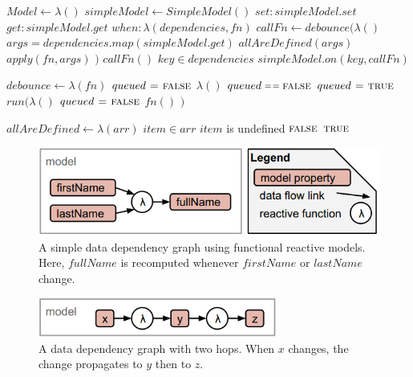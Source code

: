 \begin{codebox}
\li $Model \gets \lambda()$
\Do
  \li $simpleModel \gets SimpleModel()$
  \li \Return
  \Do
    \li $set: simpleModel.set$
    \li $get: simpleModel.get$
    \li $when: \lambda(dependencies, fn)$
    \Do
      \li $callFn \gets debounce(\lambda()$
      \Do
        \li $args = dependencies.map(simpleModel.get)$
        \li \If $allAreDefined(args)$
        \Do
          \li $apply(fn, args)$
        \End
      \End
      \li $)$
      \li $callFn()$
      \li \For $key \in dependencies$
      \Do
        \li $simpleModel.on(key, callFn)$
      \End  
    \End
  \End
\End
\end{codebox}
\begin{codebox}
\li $debounce \gets \lambda(fn)$
\Do
  \li $queued \mathrel{\hspace{1pt}=\hspace{1pt}} \textnormal{\scshape false}$
  \li \Return $\lambda()$
  \Do
    \li \If $queued \isequal \const{false}$
    \Do
      \li $queued \mathrel{\hspace{1pt}=\hspace{1pt}} \textnormal{\scshape true}$
      \li $run(\lambda()$
      \Do
        \li $queued \mathrel{\hspace{1pt}=\hspace{1pt}} \textnormal{\scshape false}$
        \li $fn()$
      \End
      \li $)$
    \End
  \End
\End
\end{codebox}
\begin{codebox}
\li $allAreDefined \gets \lambda(arr)$
\Do
  \li \For $item \in arr$
  \Do
    \li \If $item$ is undefined 
    \Do
      \li \Return $\textnormal{\scshape false}$
    \End
  \End
  \li \Return $\textnormal{\scshape true}$
\End
\end{codebox}

\begin{figure}[h]
  \caption{A simple data dependency graph using functional reactive models. Here, $fullName$ is recomputed whenever $firstName$ or $lastName$ change.}
  \centering
  \includegraphics[width=\textwidth]{figures/computedProperty.png}
\end{figure}
\begin{figure}[h]
  \caption{A data dependency graph with two hops. When $x$ changes, the change propagates to $y$ then to $z$.}
  \centering
  \includegraphics[width=0.7\textwidth]{figures/dependencyGraph.png}
\end{figure}

